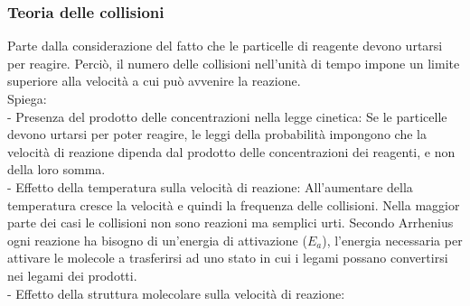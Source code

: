 \subsubsection{Teoria delle collisioni}
Parte dalla considerazione del fatto che le particelle di reagente devono urtarsi per reagire. Perciò, il numero delle collisioni nell'unità di tempo impone un limite superiore alla velocità a cui può avvenire la reazione.\\
Spiega:\\
\tab- Presenza del prodotto delle concentrazioni nella legge cinetica: Se le particelle devono urtarsi per poter reagire, le leggi della probabilità impongono che la velocità di reazione dipenda dal prodotto delle concentrazioni dei reagenti, e non della loro somma.\\
\tab- Effetto della temperatura sulla velocità di reazione: All'aumentare della temperatura cresce la velocità e quindi la frequenza delle collisioni. Nella maggior parte dei casi le collisioni non sono reazioni ma semplici urti. Secondo Arrhenius ogni reazione ha bisogno di un'energia di attivazione ($E_a$), l'energia necessaria per attivare le molecole a trasferirsi ad uno stato in cui i legami possano convertirsi nei legami dei prodotti.\\
\tab- Effetto della struttura molecolare sulla velocità di reazione: 
